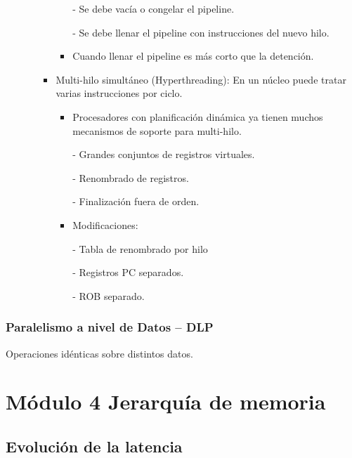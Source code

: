 \documentclass[12pt, twoside, openright]{report} %
\begin{document}
\begin{itemize}
\begin{itemize}
\begin{itemize}
\begin{itemize}
                - Se debe vacía o congelar el pipeline.

                - Se debe llenar el pipeline con instrucciones del nuevo hilo.
                \item Cuando llenar el pipeline es más corto que la detención.
              \end{itemize}
                  
              \item Multi-hilo simultáneo (Hyperthreading): En un núcleo puede tratar varias instrucciones por ciclo.
              \begin{itemize}
                \item Procesadores con planificación dinámica ya tienen muchos mecanismos de soporte para multi-hilo.
                
                - Grandes conjuntos de registros virtuales.

                - Renombrado de registros.

                - Finalización fuera de orden.
                \item Modificaciones:
                
                - Tabla de renombrado por hilo

                - Registros PC separados.

                - ROB separado.
              \end{itemize}
                  
            \end{itemize}
          \end{itemize}
      \end{itemize}
      \subsection{Paralelismo a nivel de Datos -- DLP}
          Operaciones idénticas sobre distintos datos.
  
  \chapter{Módulo 4 Jerarquía de memoria}
  \section{Evolución de la latencia}
\end{document}
